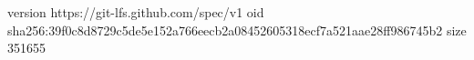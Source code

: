 version https://git-lfs.github.com/spec/v1
oid sha256:39f0c8d8729c5de5e152a766eecb2a08452605318ecf7a521aae28ff986745b2
size 351655
